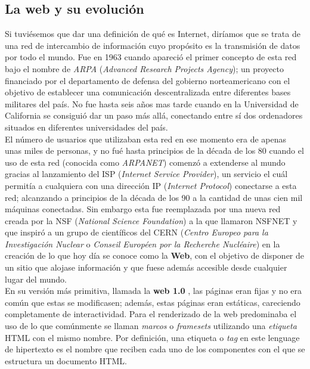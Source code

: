 \documentclass[../main.tex]{subfiles}
\begin{document}
    \subsection{La web y su evolución}
    Si tuviésemos que dar una definición de qué es Internet, diríamos que se trata de una red de intercambio de información cuyo propósito es la transmisión de datos por todo el mundo. Fue en 1963 cuando apareció el primer concepto de esta red bajo el nombre de \textit{ARPA} (\textit{Advanced Research Projects Agency}); un proyecto financiado por el departamento de defensa del gobierno norteamericano con el objetivo de establecer una comunicación descentralizada entre diferentes bases militares del país. No fue hasta seis años mas tarde cuando en la Universidad de California se consiguió dar un paso más allá, conectando entre sí dos ordenadores situados en diferentes universidades del país. \\
    
    El número de usuarios que utilizaban esta red en ese momento era de apenas unas miles de personas, y no fué hasta principios de la década de los 80 cuando el uso de esta red (conocida como \textit{ARPANET}) comenzó a extenderse al mundo gracias al lanzamiento del ISP (\textit{Internet Service Provider}), un servicio el cuál permitía a cualquiera con una dirección IP (\textit{Internet Protocol}) conectarse a esta red; alcanzando a principios de la década de los 90 a la cantidad de unas cien mil máquinas conectadas. Sin embargo esta fue reemplazada por una nueva red creada por la NSF (\textit{National Science Foundation}) a la que llamaron NSFNET y que inspiró a un grupo de científicos del CERN (\textit{Centro Europeo para la Investigación Nuclear} o \textit{Conseil Européen por la Recherche Nucléaire}) en la creación de lo que hoy día se conoce como la \textbf{Web}, con el objetivo de disponer de un sitio que alojase información y que fuese además accesible desde cualquier lugar del mundo.\\ 
    
    
    En su versión más primitiva, llamada la \textbf{web 1.0} \cite{web1.0}, las páginas eran fijas y no era común que estas se modificasen; además, estas páginas eran estáticas, careciendo completamente de interactividad. Para el renderizado de la web predominaba el uso de lo que comúnmente se llaman \textit{marcos} o \textit{framesets} utilizando una \textit{etiqueta} HTML con el mismo nombre. Por definición, una etiqueta o \textit{tag} en este lenguage de hipertexto es el nombre que reciben cada uno de los componentes con el que se estructura un documento HTML.\\
    
\end{document}
